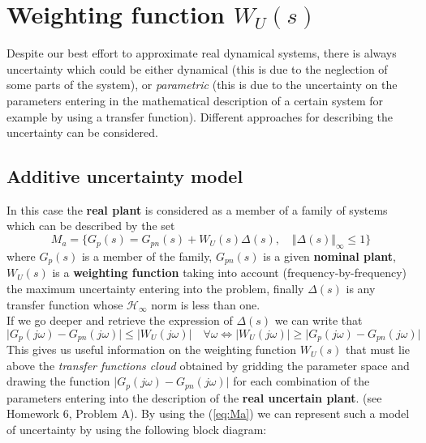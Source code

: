 \documentclass[a4paper, 12pt]{article}
\begin{document}
    \section{Weighting function $W_U(s)$}
    Despite our best effort to approximate real dynamical systems, there is always uncertainty which could be either dynamical (this is due to the neglection of some parts of the system), or \textit{parametric} (this  is due to the uncertainty on the parameters entering in the mathematical description of a certain system for example by using a transfer function). Different approaches for describing the uncertainty can be considered.

    \subsection{Additive uncertainty model}
    In this case the \textbf{real plant} is considered as a member of a family of systems which can be described by the set 
    \begin{equation}\label{eq:Ma}
        M_a = \{
            G_p(s)=G_{pn}(s)+W_U(s)\Delta(s), \quad \Vert \Delta(s) \Vert_\infty \le 1 
        \}
    \end{equation}
    where $G_p(s)$ is a member of the family, $G_{pn}(s)$ is a given \textbf{nominal plant}, $W_U(s)$ is a \textbf{weighting function} taking into account (frequency-by-frequency) the maximum uncertainty entering into the problem, finally $\Delta(s)$ is any transfer function whose $\mathcal{H}_\infty$ norm is less than one.\\
    If we go deeper and retrieve the expression of $\Delta(s)$ we can write that
    \begin{equation}\label{eq:cloud_a}
        \vert G_p(j\omega)-G_{pn}(j\omega)    \vert \le \vert W_U(j\omega) \vert \quad \forall \omega \iff
        \vert W_U(j\omega) \vert   \ge  \vert G_p(j\omega)-G_{pn}(j\omega)    \vert
    \end{equation}
    This gives us useful information on the weighting function $W_U(s)$ that must lie above the \textit{transfer functions cloud} obtained by gridding the parameter space and drawing the function $\vert G_p(j\omega)-G_{pn}(j\omega) \vert$ for each combination of the parameters entering into the description of the \textbf{real uncertain plant}. (see Homework 6, \textsf{Problem A}).
    By using the (\ref{eq:Ma}) we can represent such a model of uncertainty by using the following block diagram:
\end{document}
